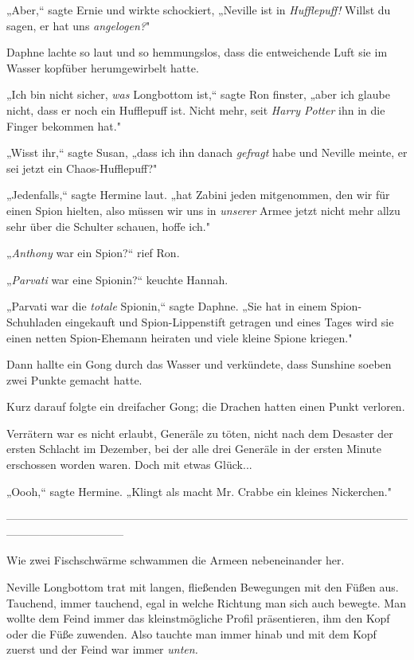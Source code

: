 {„Aber,“ sagte Ernie und wirkte schockiert, „Neville ist in \emph{Hufflepuff!} Willst du sagen, er hat uns \emph{angelogen?}"

Daphne lachte so laut und so hemmungslos, dass die entweichende Luft sie im Wasser kopfüber herumgewirbelt hatte.

„Ich bin nicht sicher, \emph{was} Longbottom ist,“ sagte Ron finster, „aber ich glaube nicht, dass er noch ein Hufflepuff ist. Nicht mehr, seit \emph{Harry Potter} ihn in die Finger bekommen hat."

„Wisst ihr,“ sagte Susan, „dass ich ihn danach \emph{gefragt} habe und Neville meinte, er sei jetzt ein Chaos-Hufflepuff?"

„Jedenfalls,“ sagte Hermine laut. „hat Zabini jeden mitgenommen, den wir für einen Spion hielten, also müssen wir uns in \emph{unserer} Armee jetzt nicht mehr allzu sehr über die Schulter schauen, hoffe ich."

„\emph{Anthony} war ein Spion?“ rief Ron.

„\emph{Parvati} war eine Spionin?“ keuchte Hannah.

„Parvati war die \emph{totale} Spionin,“ sagte Daphne. „Sie hat in einem Spion-Schuhladen eingekauft und Spion-Lippenstift getragen und eines Tages wird sie einen netten Spion-Ehemann heiraten und viele kleine Spione kriegen."

Dann hallte ein Gong durch das Wasser und verkündete, dass Sunshine soeben zwei Punkte gemacht hatte.

Kurz darauf folgte ein dreifacher Gong; die Drachen hatten einen Punkt verloren.

Verrätern war es nicht erlaubt, Generäle zu töten, nicht nach dem Desaster der ersten Schlacht im Dezember, bei der alle drei Generäle in der ersten Minute erschossen worden waren. Doch mit etwas Glück...

„Oooh,“ sagte Hermine. „Klingt als macht Mr. Crabbe ein kleines Nickerchen."

--------------------------------------------------------------------------------------------------------------------------------------------

\hfill\break Wie zwei Fischschwärme schwammen die Armeen nebeneinander her.

Neville Longbottom trat mit langen, fließenden Bewegungen mit den Füßen aus. Tauchend, immer tauchend, egal in welche Richtung man sich auch bewegte. Man wollte dem Feind immer das kleinstmögliche Profil präsentieren, ihm den Kopf oder die Füße zuwenden. Also tauchte man immer hinab und mit dem Kopf zuerst und der Feind war immer \emph{unten.}

}
